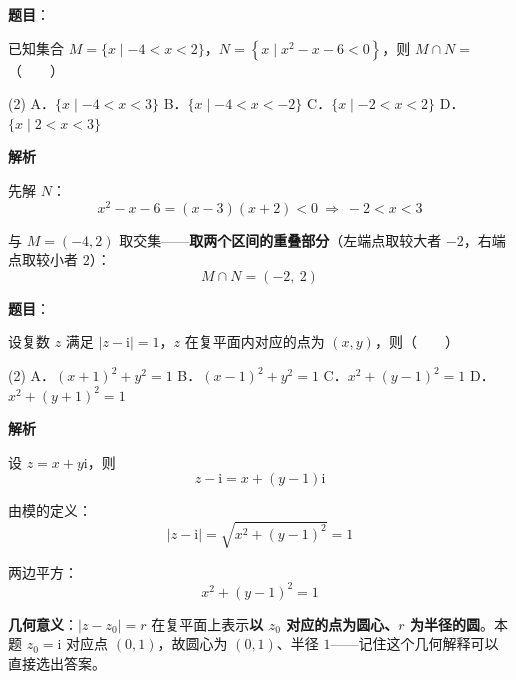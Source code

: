 \begin{answer}

\textbf{题目}：

已知集合 $M=\{x\mid-4<x<2\}$，$N=\left\{x\mid x^{2}-x-6<0\right\}$，则 $M\cap N=$\mbox{（　　）}

\begin{gkopts}(2)
\task A．$\{x\mid-4<x<3\}$
\task B．$\{x\mid-4<x<-2\}$
\task C．$\{x\mid-2<x<2\}$
\task D．$\{x\mid2<x<3\}$
\end{gkopts}

\textbf{解析}

先解 $N$：
\nopagebreak[4]
\[x^{2}-x-6=(x-3)(x+2)<0\ \Longrightarrow\ -2<x<3\]

与 $M=(-4,2)$ 取交集——\textbf{取两个区间的重叠部分}（左端点取较大者 $-2$，右端点取较小者 $2$）：
\nopagebreak[4]
\[M\cap N=(-2,\ 2)\]


\par\medskip

\end{answer}
\begin{answer}

\textbf{题目}：

设复数 $z$ 满足 $|z-\mathrm i|=1$，$z$ 在复平面内对应的点为 $(x,y)$，则\mbox{（　　）}

\begin{gkopts}(2)
\task A．$(x+1)^{2}+y^{2}=1$
\task B．$(x-1)^{2}+y^{2}=1$
\task C．$x^{2}+(y-1)^{2}=1$
\task D．$x^{2}+(y+1)^{2}=1$
\end{gkopts}

\textbf{解析}

设 $z=x+y\mathrm i$，则
\nopagebreak[4]
\[z-\mathrm i=x+(y-1)\mathrm i\]

由模的定义：
\nopagebreak[4]
\[|z-\mathrm i|=\sqrt{x^{2}+(y-1)^{2}}=1\]

两边平方：
\nopagebreak[4]
\[x^{2}+(y-1)^{2}=1\]

\begin{gktip}
\textbf{几何意义}：$|z-z_0|=r$ 在复平面上表示\textbf{以 $z_0$ 对应的点为圆心、$r$ 为半径的圆}。本题 $z_0=\mathrm i$ 对应点 $(0,1)$，故圆心为 $(0,1)$、半径 $1$——记住这个几何解释可以直接选出答案。
\end{gktip}


\par\medskip

\end{answer}
